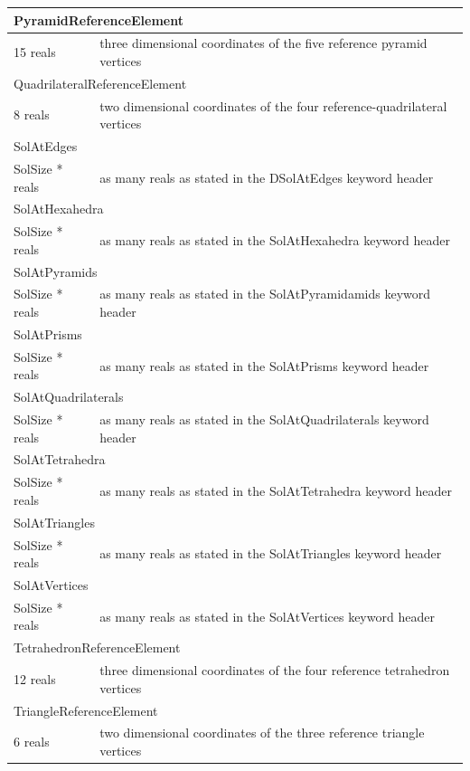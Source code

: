 \documentclass[a4paper,12pt]{article}
\begin{document}
\begin{longtable}{|m{4cm}|m{11cm}|}
\multicolumn{2}{|l|}{PyramidReferenceElement} \\
\hline
15 reals & three dimensional coordinates of the five reference pyramid vertices \\
\hline\hline

\multicolumn{2}{|l|}{QuadrilateralReferenceElement} \\
\hline
8 reals & two dimensional coordinates of the four reference-quadrilateral vertices \\
\hline\hline

\multicolumn{2}{|l|}{SolAtEdges} \\
\hline
SolSize * reals & as many reals as stated in the DSolAtEdges keyword header \\
\hline\hline

\multicolumn{2}{|l|}{SolAtHexahedra} \\
\hline
SolSize * reals & as many reals as stated in the SolAtHexahedra keyword header \\
\hline\hline

\multicolumn{2}{|l|}{SolAtPyramids} \\
\hline
SolSize * reals & as many reals as stated in the SolAtPyramidamids keyword header \\
\hline\hline

\multicolumn{2}{|l|}{SolAtPrisms} \\
\hline
SolSize * reals & as many reals as stated in the SolAtPrisms keyword header \\
\hline\hline

\multicolumn{2}{|l|}{SolAtQuadrilaterals} \\
\hline
SolSize * reals & as many reals as stated in the SolAtQuadrilaterals keyword header \\
\hline\hline

\multicolumn{2}{|l|}{SolAtTetrahedra} \\
\hline
SolSize * reals & as many reals as stated in the SolAtTetrahedra keyword header \\
\hline\hline

\multicolumn{2}{|l|}{SolAtTriangles} \\
\hline
SolSize * reals & as many reals as stated in the SolAtTriangles keyword header \\
\hline\hline

\multicolumn{2}{|l|}{SolAtVertices} \\
\hline
SolSize * reals & as many reals as stated in the SolAtVertices keyword header \\
\hline\hline

\multicolumn{2}{|l|}{TetrahedronReferenceElement} \\
\hline
12 reals & three dimensional coordinates of the four reference tetrahedron vertices \\
\hline\hline

\multicolumn{2}{|l|}{TriangleReferenceElement} \\
\hline
6 reals & two dimensional coordinates of the three reference triangle vertices \\
\hline

\end{longtable}
\end{document}
